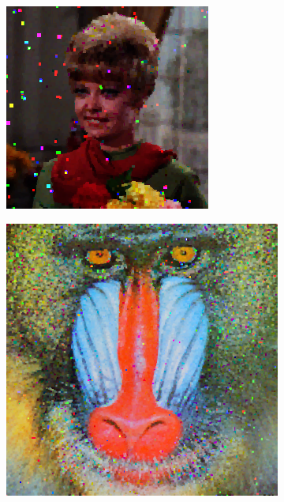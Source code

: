 \begin{subfigure}{0.9\textwidth}
\begin{subfigure}[t]{0.15\textwidth}
    \centering
  \end{subfigure}
\begin{subfigure}[t]{0.15\textwidth}
    \includegraphics[width=0.9\linewidth]{../images/outputs/denoise/hg/hg2.png}
    
    \centering
  \end{subfigure}
\begin{subfigure}[t]{0.15\textwidth}
    \includegraphics[width=0.9\linewidth]{../images/outputs/denoise/hg/hg3.png}
    

\end{subfigure}
\end{subfigure}
